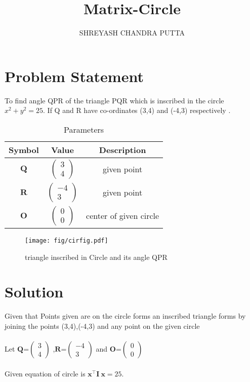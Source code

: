 \documentclass[journal,12pt,twocolumn]{article}
\title{
Matrix-Circle
}
\author{SHREYASH CHANDRA PUTTA}
\newcommand{\myvec}[1]{\ensuremath{\begin{pmatrix}#1\end{pmatrix}}}
\let\vec\mathbf
\begin{document}
\maketitle
\tableofcontents
\bigskip
\section{Problem Statement}
To find angle QPR of the triangle PQR which is inscribed in the circle $x^2 + y^2 = 25$. If Q and R  have  co-ordinates (3,4) and (-4,3) respectively .

\begin{table}[h]
    \centering
    \begin{tabular}{|c|c|c|}
       \hline
       \textbf{Symbol}&\textbf{Value}&\textbf{Description}  \\
       \hline
	    $\vec{Q}$ & $\myvec{
		    3\\
		    4}$
	    & given point\\
        \hline
	    $\vec{R}$ & $\myvec{-4\\3}$
 & given point\\
        \hline
	    $\vec{O}$ & $\myvec{0\\0}$
 & center of given circle  \\
       \hline
    \end{tabular}
    \caption{Parameters}
    \label{tab:my_label}
\end{table}

\begin{figure}[h]
    \centering
\texttt{[image: fig/cirfig.pdf]}
    \caption{triangle inscribed in Circle and its angle QPR }
    \label{fig:my_label}
\end{figure}
\vspace{2cm}
\section{Solution}
Given that Points given are on the circle forms an inscribed triangle forms by joining the points (3,4),(-4,3) and any point on the given circle   \\
\\
Let ${\vec{Q}}$=$\myvec{
  3\\
  4}$
  ,${\vec{R}}$=$\myvec{
  -4\\
  3}$
 and ${\vec{O}}$=$\myvec{
  0\\
  0}$
\\
\\
Given equation of circle is ${\vec{x^{\top}}\vec{I}\vec{\ x}} = 25$.
\\
\end{document}
